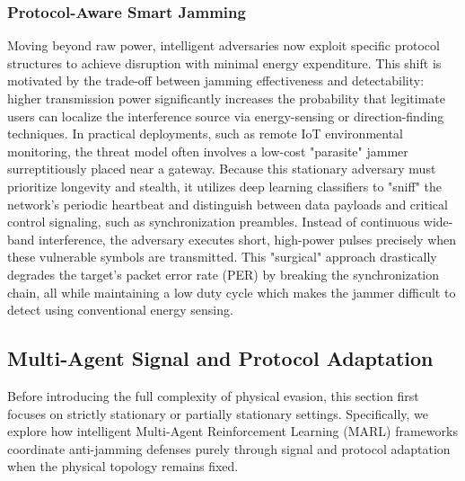 \documentclass[conference]{IEEEtran}
\newcommand{\adm}[1]{{\color{orange}{[#1]}}}
\begin{document}
\subsubsection{Protocol-Aware Smart Jamming}
Moving beyond raw power, intelligent adversaries now exploit specific protocol structures to achieve disruption with minimal energy expenditure.
This shift is motivated by the trade-off between jamming effectiveness and detectability: higher transmission power significantly increases the probability that legitimate users can localize the interference source via energy-sensing or direction-finding techniques. 
In practical deployments, such as remote IoT environmental monitoring, the threat model often involves a low-cost "parasite" jammer surreptitiously placed near a gateway.
Because this stationary adversary must prioritize longevity and stealth, it utilizes deep learning classifiers to "sniff" the network’s periodic heartbeat and distinguish between data payloads and critical control signaling, such as synchronization preambles.
Instead of continuous wide-band interference, the adversary executes short, high-power pulses precisely when these vulnerable symbols are transmitted. 
This "surgical" approach drastically degrades the target's packet error rate (PER) by breaking the synchronization chain, all while maintaining a low duty cycle which makes the jammer difficult to detect using conventional energy sensing.

\subsection{Multi-Agent Signal and Protocol Adaptation}
Before introducing the full complexity of physical evasion, this section first focuses on strictly stationary or partially stationary settings.
Specifically, we explore how intelligent Multi-Agent Reinforcement Learning (MARL) frameworks coordinate anti-jamming defenses purely through signal and protocol adaptation when the physical topology remains fixed.
\end{document}

